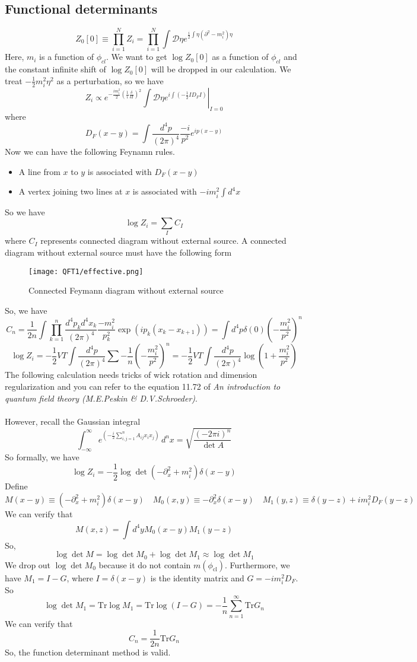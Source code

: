 \documentclass[cyan]{elegantnote}
\begin{document}
\subsection{Functional determinants}
\[Z_0[0] \equiv \prod_{i=1}^{N} Z_i  = \prod_{i=1}^{N} \int \mathcal{D}\eta e^{ \frac{i}{2}\int \eta \left( \partial^2-m_i^2\right) \eta }\]
Here, $m_i$ is a function of $\phi_{cl}$. We want to get $\log Z_0[0]$ as a function of $\phi_{cl}$ and the constant infinite shift of $\log Z_0[0]$ will be dropped in our calculation. We treat $-\frac{1}{2}m_i^2\eta^2$ as a perturbation, so we have
\[Z_i \propto e^{-\frac{im_i^2}{2}(\frac{1}{i} \frac{\delta}{\delta I})^2} \left. \int \mathcal{D}\eta e^{i\int \left(-\frac{1}{2} I D_F I \right)} \right|_{I=0}\] 
where
\[D_F(x-y) = \int \frac{d^4p}{(2\pi)^4} \frac{-i}{p^2}e^{ip(x-y)}\]
Now we can have the following Feynamn rules.
\begin{itemize}
\item A line from $x$ to $y$ is associated with $D_F(x-y)$
\item A vertex joining two lines at $x$ is associated with $-im_i^2\int d^4x$
\end{itemize}
So we have
\[\log Z_i = \sum_{I}C_I\]
where $C_I$ represents connected diagram without external source.
A connected diagram without external source must have the following form

\begin{figure}[!h]
\centering
\texttt{[image: QFT1/effective.png]}
\caption{Connected Feymann diagram without external source}
\end{figure}

\noindent
So, we have
\[C_n = \frac{1}{2n}\int \prod_{k=1}^{n} \frac{d^4p_k d^4x_k}{(2\pi)^4} \frac{-m_i^2}{p_k^2} \exp(ip_k(x_k-x_{k+1})) = \int d^4p \delta(0) \left(-\frac{m_i^2}{p^2} \right)^n\]
\[\log Z_i = -\frac{1}{2}VT \int \frac{d^4p}{(2\pi)^4} \sum -\frac{1}{n} \left(-\frac{m_i^2}{p^2} \right)^n = -\frac{1}{2}VT\int  \frac{d^4p}{(2\pi)^4} \log(1+\frac{m_i^2}{p^2})\]
The following calculation needs tricks of wick rotation and dimension regularization and you can refer to the equation 11.72 of \emph{An introduction to quantum field theory (M.E.Peskin \& D.V.Schroeder)}.\\ \\
However, recall the Gaussian integral
\[\int _{-\infty }^{\infty }e^{\left(-{\frac {i}{2}}\sum \limits _{i,j=1}^{n}A_{ij}x_{i}x_{j}\right)}\,d^{n}x
= {\sqrt {\frac {(-2\pi i)^{n}}{\det A}}} \]
So formally, we have
\[\log Z_i = -\frac{1}{2}\log \det (-\partial_x^2 + m_i^2)\delta(x-y)\]
Define
\[M(x-y) \equiv (-\partial_x^2 + m_i^2)\delta(x-y) \quad M_0(x,y) \equiv -\partial_x^2\delta(x-y) \quad M_1(y,z) \equiv \delta(y-z) + im_i^2D_F(y-z)\]
We can verify that
\[M(x,z) = \int d^4y M_0(x-y)M_1(y-z)\]
So, 
\[\log \det M = \log \det M_0 + \log \det M_1 \approx \log \det M_1\]
We drop out $\log \det M_0$ because it do not contain $m(\phi_{\mathrm{cl}})$. Furthermore, we have $M_1 = I - G$, where $I = \delta(x-y)$ is the identity matrix and $G = -im_i^2D_F$. So
\[\log \det M_1 =  \mathrm{Tr} \log M_1 = \mathrm{Tr} \log(I-G) = -\frac{1}{n}\sum_{n=1}^{\infty} \mathrm{Tr} G_n\]
We can verify that
\[C_n = \frac{1}{2n} \mathrm{Tr} G_n\]
So, the function determinant method is valid.
\end{document}
